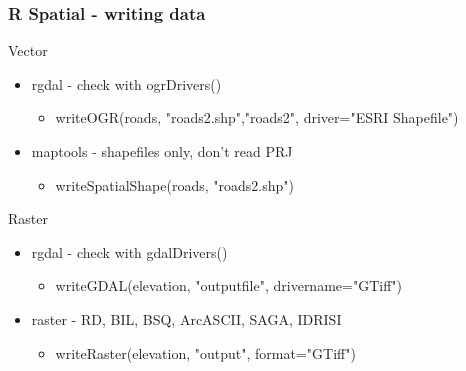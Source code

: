 \documentclass[11pt]{beamer}
\begin{document}
\begin{frame}
\frametitle{R Spatial - writing data}
Vector
\begin{itemize}
\item rgdal - check with ogrDrivers()
\begin{itemize}
\item writeOGR(roads, "roads2.shp","roads2", driver="ESRI Shapefile")
\end{itemize}
\item maptools - shapefiles only, don't read PRJ
\begin{itemize}
\item writeSpatialShape(roads, "roads2.shp")
\end{itemize}
\end{itemize}
Raster
\begin{itemize}
\item rgdal - check with gdalDrivers()
\begin{itemize}
\item writeGDAL(elevation, "outputfile", drivername="GTiff")
\end{itemize}
\item raster - RD, BIL, BSQ, ArcASCII, SAGA, IDRISI
\begin{itemize}
\item writeRaster(elevation, "output", format="GTiff")
\end{itemize}
\end{itemize}
\end{frame}
\end{document}
